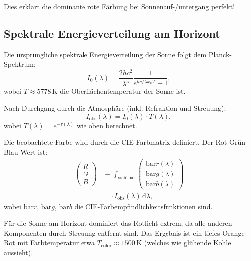 \documentclass[12pt,a4paper]{article}
\providecommand{\SI}[2]{\ensuremath{#1\,#2}}
\providecommand{\kelvin}{\mathrm{K}}
\providecommand{\bar}{\mathrm{bar}}
\begin{document}
Dies erklärt die dominante rote Färbung bei Sonnenauf-/untergang perfekt!

\subsection{Spektrale Energieverteilung am Horizont}
\label{subsec:spektrale_verteilung}

Die ursprüngliche spektrale Energieverteilung der Sonne folgt dem Planck-Spektrum:
\begin{equation}
	I_0(\lambda) = \frac{2hc^2}{\lambda^5} \frac{1}{e^{hc/\lambda k_B T} - 1},
	\label{eq:planck}
\end{equation}
wobei $T \approx \SI{5778}{\kelvin}$ die Oberflächentemperatur der Sonne ist.

Nach Durchgang durch die Atmosphäre (inkl. Refraktion und Streuung):
\begin{equation}
	I_{\mathrm{obs}}(\lambda) = I_0(\lambda) \cdot T(\lambda),
	\label{eq:I_obs}
\end{equation}
wobei $T(\lambda) = e^{-\tau(\lambda)}$ wie oben berechnet.

Die beobachtete Farbe wird durch die CIE-Farbmatrix definiert. Der Rot-Grün-Blau-Wert ist:
\begin{equation}
  \begin{aligned}
  \begin{pmatrix} R \\ G \\ B \end{pmatrix}
  &= \int_{\text{sichtbar}}
  \begin{pmatrix} \bar{r}(\lambda) \\ \bar{g}(\lambda) \\ \bar{b}(\lambda) \end{pmatrix} \\
  &\quad \cdot I_{\mathrm{obs}}(\lambda) \, \mathrm{d}\lambda,
  \end{aligned}
	\label{eq:RGB}
\end{equation}
wobei $\bar{r}$, $\bar{g}$, $\bar{b}$ die CIE-Farbempfindlichkeitsfunktionen sind.

Für die Sonne am Horizont dominiert das Rotlicht extrem, da alle anderen Komponenten
durch Streuung entfernt sind. Das Ergebnis ist ein tiefes Orange-Rot mit Farbtemperatur
etwa $T_{\mathrm{color}} \approx \SI{1500}{\kelvin}$ (welches wie glühende Kohle aussieht).
\end{document}
